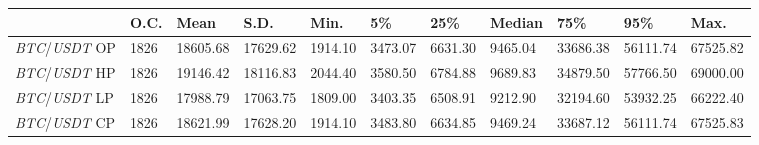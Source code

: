 \begin{tabular}{lllllllllll}
\toprule
 & \textbf{O.C.} & \textbf{Mean} & \textbf{S.D.} & \textbf{Min.} & \textbf{5\%} & \textbf{25\%} & \textbf{Median} & \textbf{75\%} & \textbf{95\%} & \textbf{Max.} \\
\midrule
\emph{BTC}/\emph{USDT} OP & 1826 & 18605.68 & 17629.62 & 1914.10 & 3473.07 & 6631.30 & 9465.04 & 33686.38 & 56111.74 & 67525.82 \\
\emph{BTC}/\emph{USDT} HP & 1826 & 19146.42 & 18116.83 & 2044.40 & 3580.50 & 6784.88 & 9689.83 & 34879.50 & 57766.50 & 69000.00 \\
\emph{BTC}/\emph{USDT} LP & 1826 & 17988.79 & 17063.75 & 1809.00 & 3403.35 & 6508.91 & 9212.90 & 32194.60 & 53932.25 & 66222.40 \\
\emph{BTC}/\emph{USDT} CP & 1826 & 18621.99 & 17628.20 & 1914.10 & 3483.80 & 6634.85 & 9469.24 & 33687.12 & 56111.74 & 67525.83 \\
\bottomrule
\end{tabular}
